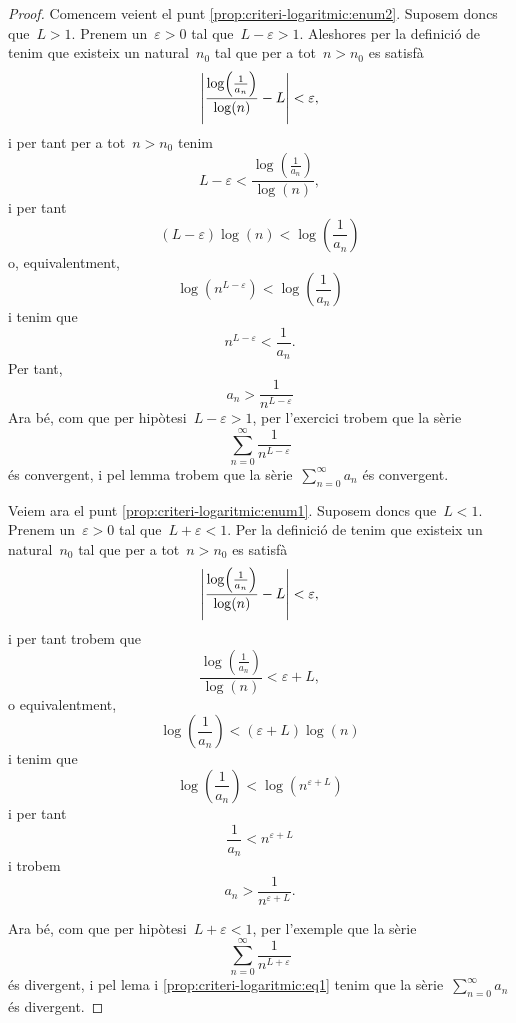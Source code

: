 \documentclass[../../main.tex]{subfiles}
\begin{document}
    \begin{proof}
        Comencem veient el punt \eqref{prop:criteri-logaritmic:enum2}.
        Suposem doncs que~\(L>1\).
        Prenem un~\(\varepsilon>0\) tal que~\(L-\varepsilon>1\).
        Aleshores per la definició de  tenim que existeix un natural~\(n_{0}\) tal que per a tot~\(n>n_{0}\) es satisfà
        \[
            \abs{\frac{\log\left(\frac{1}{a_{n}}\right)}{\log(n)}-L}<\varepsilon,
        \]
        i per tant per a tot~\(n>n_{0}\) tenim
        \[
            L-\varepsilon<\frac{\log\left(\frac{1}{a_{n}}\right)}{\log(n)},
        \]
        i per tant
        \[
            (L-\varepsilon)\log(n)<\log\left(\frac{1}{a_{n}}\right)
        \]
        o, equivalentment,
        \[
            \log\left(n^{L-\varepsilon}\right)<\log\left(\frac{1}{a_{n}}\right)
        \]
        i tenim que %
        \[
            n^{L-\varepsilon}<\frac{1}{a_{n}}.
        \]
        Per tant,
        \[
            a_{n}>\frac{1}{n^{L-\varepsilon}}
        \]
        Ara bé, com que per hipòtesi~\(L-\varepsilon>1\), per l'exercici  trobem que la sèrie
        \[
            \sum_{n=0}^{\infty}\frac{1}{n^{L-\varepsilon}}
        \]
        és convergent, i pel lemma  trobem que la sèrie~\(\sum_{n=0}^{\infty}a_{n}\) és convergent.

        Veiem ara el punt \eqref{prop:criteri-logaritmic:enum1}.
        Suposem doncs que~\(L<1\).
        Prenem un~\(\varepsilon>0\) tal que~\(L+\varepsilon<1\).
        Per la definició de  tenim que existeix un natural~\(n_{0}\) tal que per a tot~\(n>n_{0}\) es satisfà
        \[
            \abs{\frac{\log\left(\frac{1}{a_{n}}\right)}{\log(n)}-L}<\varepsilon,
        \]
        i per tant trobem que
        \[
            \frac{\log\left(\frac{1}{a_{n}}\right)}{\log(n)}<\varepsilon+L,
        \]
        o equivalentment,
        \[
            \log\left(\frac{1}{a_{n}}\right)<(\varepsilon+L)\log(n)
        \]
        i tenim que
        \[
            \log\left(\frac{1}{a_{n}}\right)<\log\left(n^{\varepsilon+L}\right)
        \]
        i per tant
        \[
            \frac{1}{a_{n}}<n^{\varepsilon+L}
        \]
        i trobem
        \begin{equation}
            \label{prop:criteri-logaritmic:eq1}
            a_{n}>\frac{1}{n^{\varepsilon+L}}.
        \end{equation}

        Ara bé, com que per hipòtesi~\(L+\varepsilon<1\), per l'exemple  que la sèrie
        \[
            \sum_{n=0}^{\infty}\frac{1}{n^{L+\varepsilon}}
        \]
        és divergent, i pel lema  i \eqref{prop:criteri-logaritmic:eq1} tenim que la sèrie~\(\sum_{n=0}^{\infty}a_{n}\) és divergent.
    \end{proof}
\end{document}
